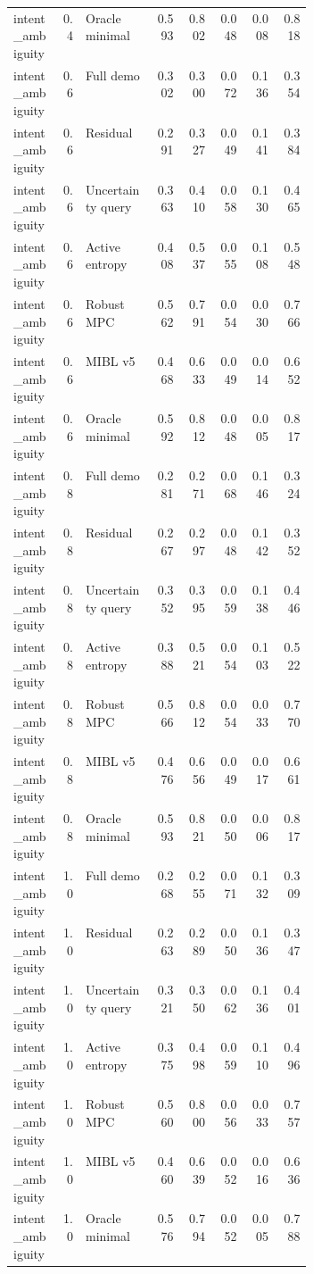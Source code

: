\documentclass{article}
\begin{document}
\begin{center}
\begin{longtable}{p{0.16\linewidth}rp{0.23\linewidth}rrrrr}
intent\_ambiguity & 0.4 & Oracle minimal & 0.593 & 0.802 & 0.048 & 0.008 & 0.818\\
intent\_ambiguity & 0.6 & Full demo & 0.302 & 0.300 & 0.072 & 0.136 & 0.354\\
intent\_ambiguity & 0.6 & Residual & 0.291 & 0.327 & 0.049 & 0.141 & 0.384\\
intent\_ambiguity & 0.6 & Uncertainty query & 0.363 & 0.410 & 0.058 & 0.130 & 0.465\\
intent\_ambiguity & 0.6 & Active entropy & 0.408 & 0.537 & 0.055 & 0.108 & 0.548\\
intent\_ambiguity & 0.6 & Robust MPC & 0.562 & 0.791 & 0.054 & 0.030 & 0.766\\
intent\_ambiguity & 0.6 & MIBL v5 & 0.468 & 0.633 & 0.049 & 0.014 & 0.652\\
intent\_ambiguity & 0.6 & Oracle minimal & 0.592 & 0.812 & 0.048 & 0.005 & 0.817\\
intent\_ambiguity & 0.8 & Full demo & 0.281 & 0.271 & 0.068 & 0.146 & 0.324\\
intent\_ambiguity & 0.8 & Residual & 0.267 & 0.297 & 0.048 & 0.142 & 0.352\\
intent\_ambiguity & 0.8 & Uncertainty query & 0.352 & 0.395 & 0.059 & 0.138 & 0.446\\
intent\_ambiguity & 0.8 & Active entropy & 0.388 & 0.521 & 0.054 & 0.103 & 0.522\\
intent\_ambiguity & 0.8 & Robust MPC & 0.566 & 0.812 & 0.054 & 0.033 & 0.770\\
intent\_ambiguity & 0.8 & MIBL v5 & 0.476 & 0.656 & 0.049 & 0.017 & 0.661\\
intent\_ambiguity & 0.8 & Oracle minimal & 0.593 & 0.821 & 0.050 & 0.006 & 0.817\\
intent\_ambiguity & 1.0 & Full demo & 0.268 & 0.255 & 0.071 & 0.132 & 0.309\\
intent\_ambiguity & 1.0 & Residual & 0.263 & 0.289 & 0.050 & 0.136 & 0.347\\
intent\_ambiguity & 1.0 & Uncertainty query & 0.321 & 0.350 & 0.062 & 0.136 & 0.401\\
intent\_ambiguity & 1.0 & Active entropy & 0.375 & 0.498 & 0.059 & 0.110 & 0.496\\
intent\_ambiguity & 1.0 & Robust MPC & 0.560 & 0.800 & 0.056 & 0.033 & 0.757\\
intent\_ambiguity & 1.0 & MIBL v5 & 0.460 & 0.639 & 0.052 & 0.016 & 0.636\\
intent\_ambiguity & 1.0 & Oracle minimal & 0.576 & 0.794 & 0.052 & 0.005 & 0.788\\

\end{longtable}
\end{center}
\end{document}
